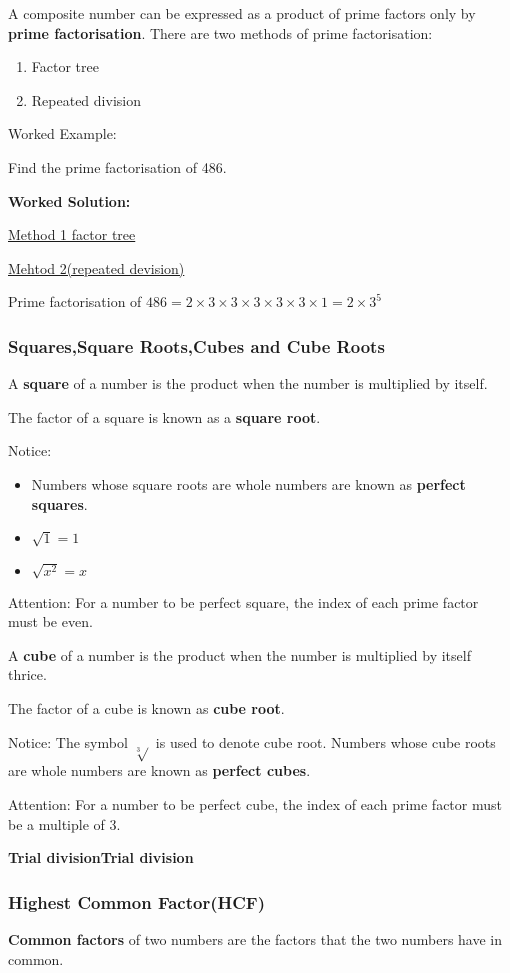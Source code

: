 \documentclass[../main]{subfiles}
\begin{document}
A composite number can be expressed as a product of prime factors only by
\textbf{prime factorisation}. There are two methods of prime factorisation:

\begin{enumerate}
\item Factor tree
\item Repeated division
\end{enumerate}

Worked Example:

Find the prime factorisation of 486.

\textbf{Worked Solution:}

\underline{Method 1 factor tree}

\underline{Mehtod 2(repeated devision)}


Prime factorisation of $486= 2\times 3 \times 3 \times 3 \times 3 \times 3
\times 1 = 2 \times 3^5$ 


\subsubsection{Squares,Square Roots,Cubes and Cube Roots}
A \textbf{square} of a number is the product when the number is multiplied by
itself.

The factor of a square is known as a \textbf{square root}.

Notice: \begin{itemize}
  \item Numbers whose square roots are whole numbers are known as
\textbf{perfect squares}.
\item $\sqrt{1}=1$
\item $\sqrt{x^2}=x$
\end{itemize}

Attention: For a number to be perfect square, the index of each prime factor
must be even. 

A \textbf{cube} of a number is the product when the number is multiplied by
itself thrice.

The factor of a cube is known as \textbf{cube root}.

Notice: The symbol $\sqrt[3]{}$ is used to denote cube root.
Numbers whose cube roots are whole numbers are known as \textbf{perfect cubes}.


Attention: For a number to be perfect cube, the index of each prime factor must
be a multiple of 3.

\textbf{Trial division}\textbf{Trial division } 
\subsubsection{Highest Common Factor(HCF)}
\textbf{Common factors} of two numbers are the factors that the two numbers have
in common.
\end{document}

